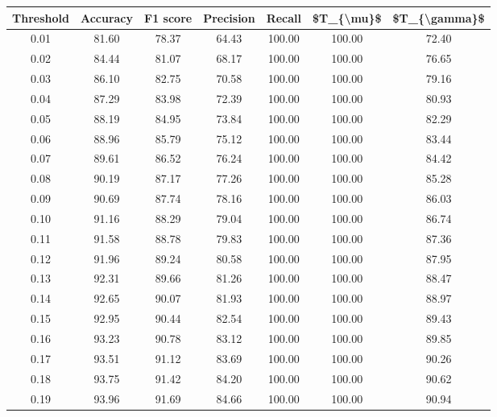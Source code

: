 \begin{tabular}{|c|c|c|c|c|c|c|}
\hline
 Threshold &  Accuracy &  F1 score &  Precision &  Recall &  \$T\_\{\textbackslash mu\}\$ &  \$T\_\{\textbackslash gamma\}\$ \\
\hline
      0.01 &     81.60 &     78.37 &      64.43 &  100.00 &     100.00 &         72.40 \\
      0.02 &     84.44 &     81.07 &      68.17 &  100.00 &     100.00 &         76.65 \\
      0.03 &     86.10 &     82.75 &      70.58 &  100.00 &     100.00 &         79.16 \\
      0.04 &     87.29 &     83.98 &      72.39 &  100.00 &     100.00 &         80.93 \\
      0.05 &     88.19 &     84.95 &      73.84 &  100.00 &     100.00 &         82.29 \\
      0.06 &     88.96 &     85.79 &      75.12 &  100.00 &     100.00 &         83.44 \\
      0.07 &     89.61 &     86.52 &      76.24 &  100.00 &     100.00 &         84.42 \\
      0.08 &     90.19 &     87.17 &      77.26 &  100.00 &     100.00 &         85.28 \\
      0.09 &     90.69 &     87.74 &      78.16 &  100.00 &     100.00 &         86.03 \\
      0.10 &     91.16 &     88.29 &      79.04 &  100.00 &     100.00 &         86.74 \\
      0.11 &     91.58 &     88.78 &      79.83 &  100.00 &     100.00 &         87.36 \\
      0.12 &     91.96 &     89.24 &      80.58 &  100.00 &     100.00 &         87.95 \\
      0.13 &     92.31 &     89.66 &      81.26 &  100.00 &     100.00 &         88.47 \\
      0.14 &     92.65 &     90.07 &      81.93 &  100.00 &     100.00 &         88.97 \\
      0.15 &     92.95 &     90.44 &      82.54 &  100.00 &     100.00 &         89.43 \\
      0.16 &     93.23 &     90.78 &      83.12 &  100.00 &     100.00 &         89.85 \\
      0.17 &     93.51 &     91.12 &      83.69 &  100.00 &     100.00 &         90.26 \\
      0.18 &     93.75 &     91.42 &      84.20 &  100.00 &     100.00 &         90.62 \\
      0.19 &     93.96 &     91.69 &      84.66 &  100.00 &     100.00 &         90.94 \\

\end{tabular}
